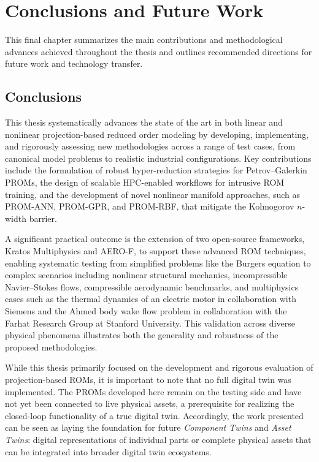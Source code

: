 \chapter{Conclusions and Future Work}

This final chapter summarizes the main contributions and methodological advances achieved throughout the thesis and outlines recommended directions for future work and technology transfer.

\section*{Conclusions}

This thesis systematically advances the state of the art in both linear and nonlinear projection-based reduced order modeling by developing, implementing, and rigorously assessing new methodologies across a range of test cases, from canonical model problems to realistic industrial configurations. Key contributions include the formulation of robust hyper-reduction strategies for Petrov–Galerkin PROMs, the design of scalable HPC-enabled workflows for intrusive ROM training, and the development of novel nonlinear manifold approaches, such as PROM-ANN, PROM-GPR, and PROM-RBF, that mitigate the Kolmogorov $n$-width barrier.

A significant practical outcome is the extension of two open-source frameworks, Kratos Multiphysics and AERO-F, to support these advanced ROM techniques, enabling systematic testing from simplified problems like the Burgers equation to complex scenarios including nonlinear structural mechanics, incompressible Navier–Stokes flows, compressible aerodynamic benchmarks, and multiphysics cases such as the thermal dynamics of an electric motor in collaboration with Siemens and the Ahmed body wake flow problem in collaboration with the Farhat Research Group at Stanford University. This validation across diverse physical phenomena illustrates both the generality and robustness of the proposed methodologies.

While this thesis primarily focused on the development and rigorous evaluation of projection-based ROMs, it is important to note that no full digital twin was implemented. The PROMs developed here remain on the testing side and have not yet been connected to live physical assets, a prerequisite for realizing the closed-loop functionality of a true digital twin. Accordingly, the work presented can be seen as laying the foundation for future \textit{Component Twins} and \textit{Asset Twins}: digital representations of individual parts or complete physical assets that can be integrated into broader digital twin ecosystems.

